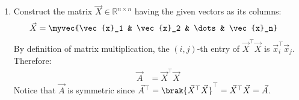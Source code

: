\begin{enumerate}[label=\thesubsection.\arabic*, ref=\thesubsection.\theenumi]
	\item 
Construct the matrix $\vec{X} \in \mathbb{R}^{n \times n}$ having the given vectors as its columns:
\begin{align}
	\vec{X} &= \myvec{\vec{x}_1 & \vec{x}_2 & \dots & \vec{x}_n}
\end{align}
By definition of matrix multiplication, the $(i, j)$-th entry of $\vec{X}^{\top}\vec{X}$ is $\vec{x}_i^{\top}\vec{x}_j$. Therefore:
\begin{align}
	\vec{A} &= \vec{X}^{\top}\vec{X} \label{eq:DA2025-A-Gram}
\end{align}
Notice that $\vec{A}$ is symmetric since $\vec{A}^{\top} = \brak{\vec{X}^{\top}\vec{X}}^{\top} = \vec{X}^{\top}\vec{X} = \vec{A}$.


\end{enumerate}
